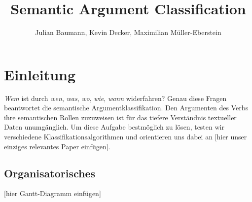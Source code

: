 \documentclass[runningheads]{llncs}
\begin{document}
\lstset{language=Python}

\title{Semantic Argument Classification}

\author{Julian Baumann, Kevin Decker, Maximilian M\"uller-Eberstein}


\maketitle

\section{Einleitung}
\textit{Wem} ist durch \textit{wen}, \textit{was}, \textit{wo}, \textit{wie}, \textit{wann} widerfahren? Genau diese Fragen beantwortet die semantische Argumentklassifikation. Den Argumenten des Verbs ihre semantischen Rollen zuzuweisen ist f\"ur das tiefere Verst\"andnis textueller Daten unumg\"anglich. Um diese Aufgabe bestm\"oglich zu l\"osen, testen wir verschiedene Klassifikationsalgorithmen und orientieren uns dabei an [hier unser einziges relevantes Paper einf\"ugen].
\subsection{Organisatorisches}
[hier Gantt-Diagramm einf\"ugen]

\begin{gantt}{10}{9}
    \begin{ganttitle}
    \end{ganttitle}
    \begin{ganttitle}
    \end{ganttitle}
  \end{gantt}
\end{document}
